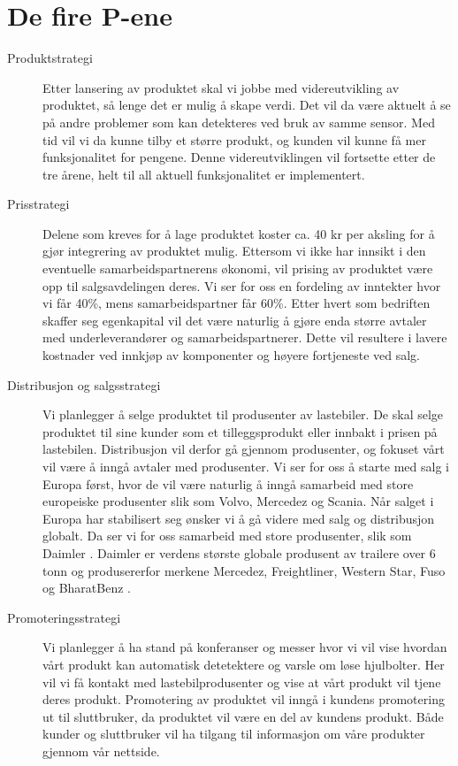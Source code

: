 \section{De fire P-ene}
\begin{description}
	\item[Produktstrategi] Etter lansering av produktet skal vi jobbe med videreutvikling av produktet, så lenge det er mulig å skape verdi. Det vil da være aktuelt å se på andre problemer som kan detekteres ved bruk av 			samme sensor. Med tid vil vi da kunne tilby et større produkt, og kunden vil kunne få mer 			funksjonalitet for pengene. Denne videreutviklingen vil fortsette etter de tre årene, helt til all aktuell 		funksjonalitet er implementert.
	\item[Prisstrategi] Delene som kreves for å lage produktet koster ca. 40 kr per aksling for å gjør integrering av produktet mulig. Ettersom vi ikke har innsikt i den eventuelle samarbeidspartnerens økonomi, vil prising av produktet være opp til salgsavdelingen deres. Vi ser for oss en fordeling av inntekter hvor vi får 40\%, mens samarbeidspartner får 60\%. Etter hvert som bedriften skaffer seg egenkapital vil det være naturlig å gjøre enda større avtaler med underleverandører og samarbeidspartnerer. Dette vil resultere i lavere kostnader ved innkjøp av komponenter og høyere fortjeneste ved salg.
	\item[Distribusjon og salgsstrategi] Vi planlegger å selge produktet til produsenter av lastebiler. De 		skal selge produktet til sine kunder som et tilleggsprodukt eller innbakt i prisen på lastebilen. 			Distribusjon vil derfor gå gjennom produsenter, og fokuset vårt vil være å inngå avtaler med 			produsenter. Vi ser for oss å starte med salg i Europa først, hvor de vil være naturlig å inngå samarbeid med store europeiske produsenter slik som Volvo, Mercedez og Scania. Når salget i Europa har stabilisert seg ønsker vi å gå videre med salg og distribusjon globalt.  Da ser vi for oss samarbeid med store produsenter, slik som Daimler \cite{daimler}. Daimler er verdens største globale produsent av 				trailere over 6 tonn og produsererfor merkene Mercedez, Freightliner, Western Star, Fuso og 			BharatBenz \cite{daimler}.
	\item[Promoteringsstrategi] Vi planlegger å ha stand på konferanser og messer hvor vi vil vise hvordan vårt 	produkt kan automatisk detetektere og varsle om løse hjulbolter. Her vil vi få kontakt med 			lastebilprodusenter og vise at vårt produkt vil tjene deres produkt. Promotering av produktet vil 		inngå i kundens promotering ut til sluttbruker, da produktet vil være en del av kundens produkt. 		Både kunder og 	sluttbruker vil ha tilgang til informasjon om våre produkter gjennom vår nettside.
\end{description}

